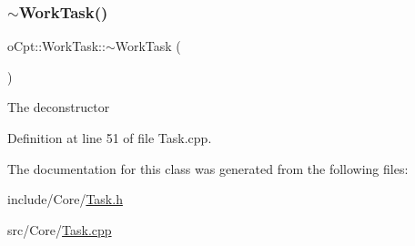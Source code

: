 \subsubsection{\texorpdfstring{$\sim$\+Work\+Task()}{~WorkTask()}}
{\footnotesize\ttfamily o\+Cpt\+::\+Work\+Task\+::$\sim$\+Work\+Task (\begin{DoxyParamCaption}{ }\end{DoxyParamCaption})\hspace{0.3cm}{\ttfamily [virtual]}}

The deconstructor 

Definition at line 51 of file Task.\+cpp.



The documentation for this class was generated from the following files\+:\begin{DoxyCompactItemize}
\item 
include/\+Core/\hyperlink{_task_8h}{Task.\+h}\item 
src/\+Core/\hyperlink{_task_8cpp}{Task.\+cpp}\end{DoxyCompactItemize}
